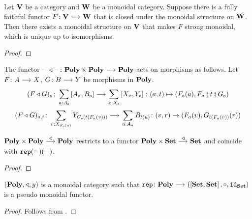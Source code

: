 \documentclass[a4paper,dvipsnames, 11pt]{amsart}
\begin{document}
\begin{proposition}
	\label{prop:FFInducesMoncat}
	Let $\mathbf{V}$ be a category and $\mathbf{W}$ be a monoidal category.
	Suppose there is a fully faithful functor $F\colon\one{V}\arr[hook]\one{W}$
	that is closed under the monoidal structure on $\mathbf{W}$.
	Then there exists a monoidal structure on $\mathbf{V}$ that makes $F$ strong monoidal,
	which is unique up to isomorphisms.
\end{proposition}
\begin{proof}
\end{proof}
\begin{remark}
	The functor $-\trleft-\colon\Poly\times\Poly\arr\Poly$ acts on morphisms as follows.
	Let $F\colon A\arr X$, $G\colon B\arr Y$ be morphisms in $\mathbf{Poly}$.
	\[
		(F\trleft G)_\ob
		\colon
		\sum_{a\tcolon A_\ob}\left[A_a,B_\ob\right]
		\arr
		\sum_{x\tcolon X_\ob}\left[X_x,Y_\ob\right]
		\colon
		(a,t)\mapsto\left(F_\ob(a),F_{a}\fatsemi t\fatsemi G_{\ob}\right)
	\]
	\[
		(F\trleft G)_{a,t}\colon
		\sum_{v\tcolon X_{F_\ob(a)}}Y_{G_\ob(t(F_{a}(v)))}
		\arr
		\sum_{u\tcolon A_{a}}B_{t(u)}
		\colon
		(v,r)
		\mapsto
		(F_a(v),G_{t(F_a(v))}(r))
	\]
\end{remark}
\begin{lemma}
	\label{lem:trleftRestSets}
	$\Poly\times\Poly\arr"\trleft"\Poly$
	restricts to a functor
	$\Poly\times\Set\arr"\trleft"\Set$
	and coincide with $\mathtt{rep}(-)(-)$.
\end{lemma}
\begin{proof}
\end{proof}
\begin{proposition}
	\label{prop:PolyMonoidalCaty}
	$(\mathbf{Poly},\triangleleft,y)$ is a monoidal category
	such that $\rep\colon\Poly\arr\left(\left[\Set,\Set\right],\circ,\id_\Set\right)$ is a pseudo monoidal functor.
\end{proposition}
\begin{proof}
	Follows from .
\end{proof}



\end{document}
